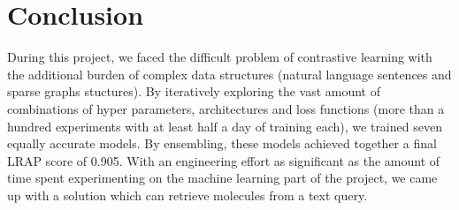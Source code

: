 \section{Conclusion}
\label{sec:conclusion}
During this project, we faced the difficult problem of contrastive learning with the additional burden of complex data structures (natural language sentences and sparse graphs stuctures). By iteratively exploring the vast amount of combinations of hyper parameters, architectures and loss functions (more than a hundred experiments with at least half a day of training each), we trained seven equally accurate models. By ensembling, these models achieved together a final LRAP score of 0.905.  With an engineering effort as significant as the amount of time spent experimenting on the machine learning part of the project, we came up with a solution which can retrieve molecules from a text query.